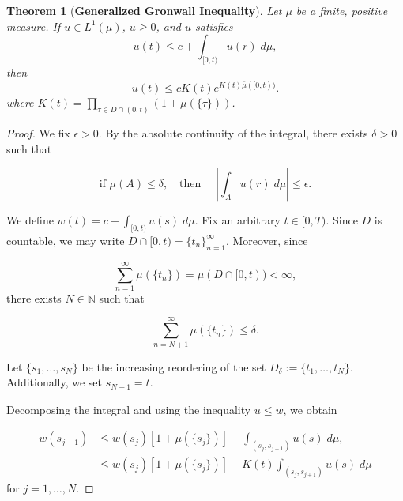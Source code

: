 \documentclass[a4paper,11pt]{amsart}
\theoremstyle{plain}
\newtheorem{thm}{Theorem}[section]
\theoremstyle{remark}
\newcommand{\nn}{\mathbb{N}}
\numberwithin{equation}{section}
\begin{document}
\begin{thm}[\textbf{Generalized Gronwall Inequality}] \label{TG} 	Let $\mu$ be a finite, positive measure. If $u\in L^1(\mu)$, $u\geq 0$, and $u$ satisfies
	\begin{equation}\label{eq:gron_hip}
		u(t)\leq c+\int_{[0,t)}u(r) \; d\mu,
	\end{equation}
then
\begin{equation}\label{eq:gron_ine}
	u(t)\leq cK(t) e^{K(t)\bar{\mu}([0,t))}.
\end{equation}
where $K(t)=\displaystyle\prod_{\tau\in D\cap(0,t)}\left( 1+\mu(\{\tau\})\right)$.
\end{thm}

\begin{proof}
We fix $\epsilon>0$. By the absolute continuity of the integral, there exists $\delta>0$ such that

\begin{equation}\label{eq:abs_cont}
    \text{if } \mu(A)\leq\delta,\quad \text{then }\quad \left| \int_A u(r)\; d\mu\right| \leq \epsilon.
\end{equation}

We define $w(t)=c+\int_{[0,t)}u(s)\;d\mu$. Fix an arbitrary $t\in [0,T)$. Since $D$ is countable, we may write $D\cap[0,t)=\{ t_n \}_{n=1}^\infty$. Moreover, since

\begin{equation}\sum_{n=1}^\infty\mu(\{t_n\})=\mu(D\cap[0,t))<\infty,\label{eq:4.1}
\end{equation}
there exists $N\in\nn$ such that

\begin{equation}\label{eq:sum_disc}
\sum_{n=N+1}^{\infty}\mu(\{t_n\})\leq \delta.
\end{equation}

Let $\{s_1,\ldots,s_N\}$ be the increasing reordering of the set $D_\delta:=\{t_1,\ldots, t_N\}$. Additionally, we set $s_{N+1}=t$.

Decomposing the integral and using the inequality $u\leq w$, we obtain

\begin{equation}
\begin{split}
	w(s_{j+1}) &\leq w(s_{j})\left[1+ \mu(\{s_{j}\})\right] +\int_{(s_{j},s_{j+1})}u(s)\;d\mu, \\
	&\leq w(s_{j})\left[1+ \mu(\{s_{j}\})\right] +K(t)\int_{(s_{j},s_{j+1})}u(s)\;d\mu
	\label{eq:T2}
 \end{split}
\end{equation}
for $j=1,\ldots,N$.


\end{proof}
\end{document}
